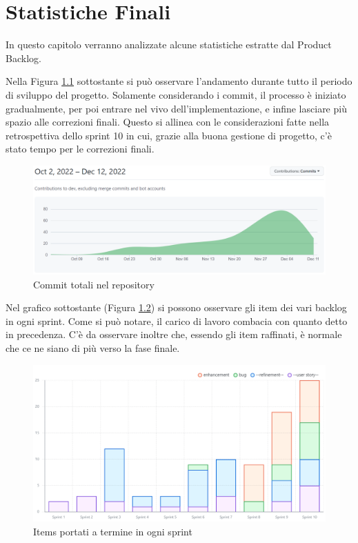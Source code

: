 \chapter{Statistiche Finali}\label{chap:final-stats}
In questo capitolo verranno analizzate alcune statistiche estratte dal Product Backlog.

\medbreak
Nella Figura \ref{fig:commits} sottostante si può osservare l'andamento durante tutto il periodo di sviluppo del progetto. Solamente considerando i commit, il processo è iniziato gradualmente, per poi entrare nel vivo dell'implementazione, e infine lasciare più spazio alle correzioni finali. Questo si allinea con le considerazioni fatte nella retrospettiva dello sprint 10 in cui, grazie alla buona gestione di progetto, c'è stato tempo per le correzioni finali.

\begin{figure}[H]
    \centering
    \includegraphics[width=\textwidth]{process/Img/charts/project-commits.png}
    \caption{Commit totali nel repository}
    \label{fig:commits}
\end{figure}

Nel grafico sottostante (Figura \ref{fig:stats-items}) si possono osservare gli item dei vari backlog in ogni sprint. Come si può notare, il carico di lavoro combacia con quanto detto in precedenza. C'è da osservare inoltre che, essendo gli item raffinati, è normale che ce ne siano di più verso la fase finale.
\begin{figure}[H]
    \centering
    \includegraphics[width=\textwidth]{process/Img/charts/items-for-sprint.png}
    \caption{Items portati a termine in ogni sprint}
   \label{fig:stats-items}
\end{figure}

